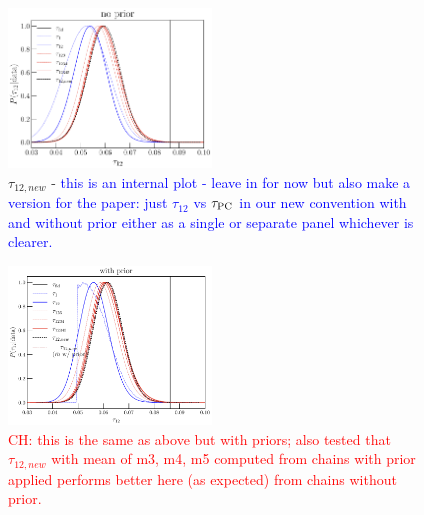 \documentclass[prd,twocolumn,amsmath,amssymb,floatfix,superscriptaddress,nofootinbib]{revtex4-1}
\newcommand{\wh}[1]{\textcolor{blue}{#1}}
\newcommand{\ch}[1]{\textcolor{red}{#1}}
\begin{document}
{\begin{figure}[ht]
\includegraphics[width=0.48\textwidth]{results/tau_pc_decomposition/plot_taumj_decomposition_apply_cut_False_pl18_pc_zmax30_pliklite_srollv2_1015.pdf}
\caption{$\tau_{12,new}$ - \wh{this is an internal plot - leave in for now but also make a version for the paper: just $\tau_{12}$ vs $\tau_{\rm PC}$ in our new convention with and without prior either as a single or separate panel whichever is clearer.}}
\label{fig:tau12}
\end{figure}

\begin{figure}[ht]
\includegraphics[width=0.48\textwidth]{results/tau_pc_decomposition/plot_taumj_decomposition_apply_cut_True_pl18_pc_zmax30_pliklite_srollv2_1015.pdf}
\caption{ \ch{CH: this is the same as above but with priors; also tested that $\tau_{12, new}$ with mean of m3, m4, m5 computed from chains with prior applied performs better here (as expected) from chains without prior.}}
\label{fig:tau12}
\end{figure}

}
\end{document}
